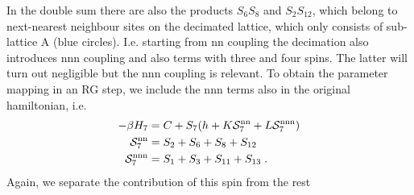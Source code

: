 In the double sum there are also the products  $S_{6} S_{8}$ and $S_{2} S_{12}$,
which belong to next-nearest neighbour sites on the decimated lattice, which only consists of sub-lattice A (blue circles). I.e. starting from nn coupling
the decimation also introduces nnn coupling and also terms with three and four spins.
The latter will turn out negligible but the nnn coupling is relevant. 
To obtain the parameter mapping in an RG step, we include the nnn terms also in the original hamiltonian, i.e. 
\begin{align*}
-\beta H_{7} &= C + S_{7} \qty(h  + K  {\cal S}^\text{nn}_{7} +L {\cal S}^\text{nnn}_{7})\\
{\cal S}^\text{nn}_{7} &= S_{2} + S_{6} + S_{8} + S_{12}\\
{\cal S}^\text{nnn}_{7} &= S_{1} + S_{3} + S_{11} + S_{13}\;.
\end{align*}
%
Again, we separate the contribution of this spin from the rest


